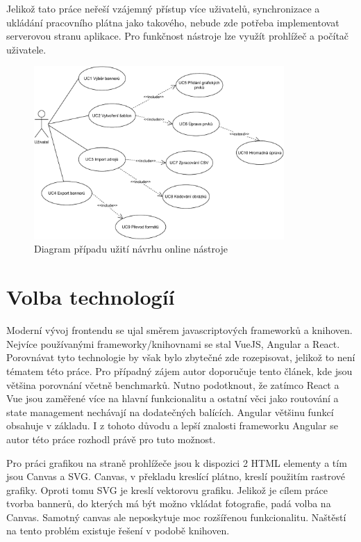    Jelikož tato práce neřeší vzájemný přístup více uživatelů, synchronizace a ukládání pracovního plátna jako takového,
    nebude zde potřeba implementovat serverovou stranu aplikace. Pro funkčnost nástroje lze využít prohlížeč a počítač uživatele.

    \begin{figure}
        \centering
        \includegraphics[width=0.85\textwidth]{Figures/use-case.pdf}
        \caption[Diagram případu užití]{Diagram případu užití návrhu online nástroje}
        \label{fig:use-case-diagram}
    \end{figure}

    \section{Volba technologíí}
    Moderní vývoj frontendu se ujal směrem javascriptových frameworků a knihoven. Nejvíce používanými frameworky/knihovnami se stal VueJS, Angular a React.
    Porovnávat tyto technologie by však bylo zbytečné zde rozepisovat, jelikož to není tématem této práce.
    Pro případný zájem autor doporučuje tento článek, kde jsou většina porovnání včetně benchmarků.
    Nutno podotknout, že zatímco React a Vue jsou zaměřené více na hlavní funkcionalitu a ostatní věci jako routování a state management nechávají
    na dodatečných balících. Angular většinu funkcí obsahuje v základu.
    I z tohoto důvodu a lepší znalosti frameworku Angular se autor této práce rozhodl právě pro tuto možnost. 

    Pro práci grafikou na straně prohlížeče jsou k dispozici 2 HTML elementy a tím jsou Canvas a SVG.
    Canvas, v překladu kreslící plátno, kreslí použitím rastrové grafiky. Oproti tomu SVG je kreslí vektorovu grafiku.
    Jelikož je cílem práce tvorba bannerů, do kterých má být možno vkládat fotografie, padá volba na Canvas.
    Samotný canvas ale neposkytuje moc rozšířenou funkcionalitu. Naštěstí na tento problém existuje řešení v podobě knihoven.

